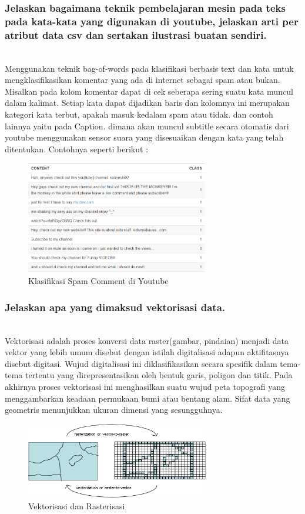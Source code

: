 \subsubsection{Jelaskan bagaimana teknik pembelajaran mesin pada teks pada kata-kata yang digunakan di youtube, jelaskan arti per atribut data csv dan sertakan ilustrasi buatan sendiri.}

\hfill\\
Menggunakan teknik bag-of-words pada klasifikasi berbasis text dan kata untuk mengklasifikasikan komentar yang ada di internet sebagai spam atau bukan. Misalkan pada kolom komentar dapat di cek seberapa sering suatu kata muncul dalam kalimat. Setiap kata dapat dijadikan baris dan kolomnya ini merupakan kategori kata terbut, apakah masuk kedalam spam atau tidak. dan contoh lainnya yaitu pada Caption. dimana akan muncul subtitle secara otomatis dari youtube menggunakan sensor suara yang disesuaikan dengan kata yang telah ditentukan. Contohnya seperti berikut :
\begin{figure}[H]
	\centering
	\includegraphics[width=8cm]{figures/1174083/figures4/3.png}
	\caption{Klasifikasi Spam Comment di Youtube}
\end{figure}

\subsubsection{Jelaskan apa yang dimaksud vektorisasi data.}
\hfill\\

Vektorisasi adalah proses konversi data raster(gambar, pindaian)  menjadi data vektor yang lebih umum disebut dengan istilah  digitalisasi adapun aktifitasnya disebut digitasi. Wujud digitalisasi ini diklasifikasikan secara spesifik dalam tema-tema tertentu yang direpresentasikan oleh bentuk garis, poligon dan titik. Pada akhirnya proses vektorisasi ini menghasilkan suatu wujud peta topografi yang menggambarkan keadaan permukaan bumi atau bentang alam. Sifat data yang geometris menunjukkan ukuran dimensi yang sesungguhnya.
\begin{figure}[H]
	\centering
	\includegraphics[width=8cm]{figures/1174083/figures4/5.png}
	\caption{Vektorisasi dan Rasterisasi}
\end{figure}

